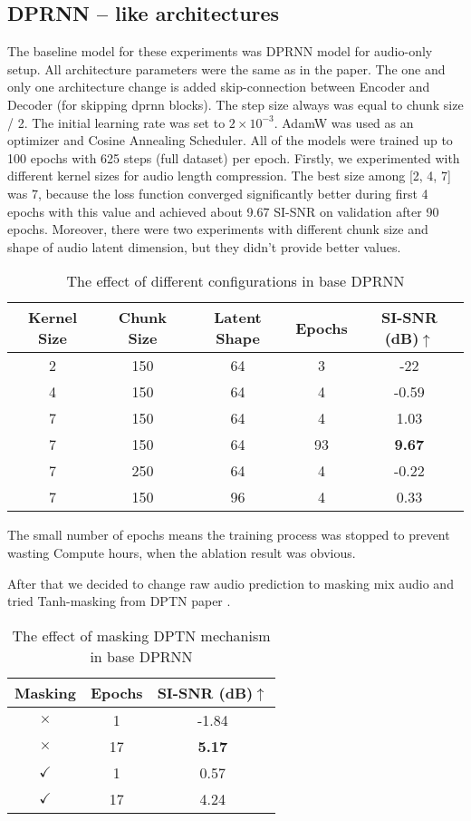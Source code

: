 \documentclass[10pt,conference,compsocconf]{IEEEtran}
\begin{document}
\subsection{\textbf{DPRNN -- like architectures}}
The baseline model for these experiments was DPRNN model \cite{luo2020dprnn} for audio-only setup. All architecture parameters were the same as in the paper. The one and only one architecture change is added skip-connection between Encoder and Decoder (for skipping dprnn blocks). The step size always was equal to chunk size / 2. The initial learning rate was
set to $2 \times 10^{-3}$. AdamW was used as an optimizer and Cosine Annealing Scheduler. All
of the models were trained up to 100 epochs with 625 steps (full dataset)
per epoch. Firstly, we experimented with different kernel sizes for audio length compression. The best size among [2, 4, 7] was 7, because the loss function converged significantly better during first 4 epochs with this value and achieved about 9.67 SI-SNR on validation after 90 epochs. Moreover, there were two experiments with different chunk size and shape of audio latent dimension, but they didn't provide better values.
\begin{table}[h!]
\centering
\caption{The effect of different configurations in base DPRNN}
\begin{tabular}{|c|c|c|c|c|}
\hline
Kernel Size & Chunk Size & Latent Shape & Epochs & SI-SNR (dB)$\uparrow$ \\ \hline
2 & 150 & 64 & 3 & -22 \\ \hline
4 & 150 & 64 & 4 & -0.59 \\ \hline
7 & 150 & 64 & 4 & 1.03 \\ \hline
7 & 150 & 64 & 93 & \textbf{9.67} \\ \hline
7 & 250 & 64 & 4 & -0.22 \\ \hline
7 & 150 & 96 & 4 & 0.33  \\ \hline
\end{tabular}
\end{table}

The small number of epochs means the training process was stopped to prevent wasting Compute hours, when the ablation result was obvious.

After that we decided to change raw audio prediction to masking mix audio and tried Tanh-masking from DPTN paper \cite{chen2020dptnet}.

\begin{table}[H]
\centering
\caption{The effect of masking DPTN mechanism in base DPRNN}
\begin{tabular}{|c|c|c|}
\hline
Masking & Epochs & SI-SNR (dB)$\uparrow$ \\ \hline
 $\times$ & 1 & -1.84 \\ \hline
 $\times$ & 17 & \textbf{5.17} \\ \hline
 $\checkmark$ & 1 &  0.57 \\ \hline
 $\checkmark$ & 17 &  4.24 \\ \hline
\end{tabular}
\end{table}
 
\end{document}
